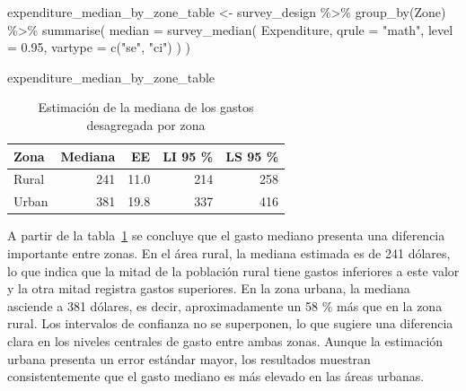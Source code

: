 \documentclass[
  spanish,
  11pt,
  letterpaper,
  oneside,
  open=any]{scrbook}
\newenvironment{Shaded}{\begin{snugshade}}{\end{snugshade}}
\newcommand{\AttributeTok}[1]{\textcolor[rgb]{0.40,0.45,0.13}{#1}}
\newcommand{\FloatTok}[1]{\textcolor[rgb]{0.68,0.00,0.00}{#1}}
\newcommand{\FunctionTok}[1]{\textcolor[rgb]{0.28,0.35,0.67}{#1}}
\newcommand{\NormalTok}[1]{\textcolor[rgb]{0.00,0.23,0.31}{#1}}
\newcommand{\OtherTok}[1]{\textcolor[rgb]{0.00,0.23,0.31}{#1}}
\newcommand{\SpecialCharTok}[1]{\textcolor[rgb]{0.37,0.37,0.37}{#1}}
\newcommand{\StringTok}[1]{\textcolor[rgb]{0.13,0.47,0.30}{#1}}
\begin{document}
\begin{Shaded}
\begin{Highlighting}[]
\NormalTok{expenditure\_median\_by\_zone\_table }\OtherTok{\textless{}{-}}\NormalTok{ survey\_design }\SpecialCharTok{\%\textgreater{}\%}
  \FunctionTok{group\_by}\NormalTok{(Zone) }\SpecialCharTok{\%\textgreater{}\%}
  \FunctionTok{summarise}\NormalTok{(}
    \AttributeTok{median =} \FunctionTok{survey\_median}\NormalTok{(}
\NormalTok{      Expenditure,}
      \AttributeTok{qrule =} \StringTok{"math"}\NormalTok{,}
      \AttributeTok{level =} \FloatTok{0.95}\NormalTok{,}
      \AttributeTok{vartype =} \FunctionTok{c}\NormalTok{(}\StringTok{"se"}\NormalTok{, }\StringTok{"ci"}\NormalTok{)}
\NormalTok{    )}
\NormalTok{  )}

\NormalTok{expenditure\_median\_by\_zone\_table}
\end{Highlighting}
\end{Shaded}

{

\begin{longtable}[]{@{}lrrrr@{}}

\caption{\label{tbl-mediana-gasto-zona}Estimación de la mediana de los
gastos desagregada por zona}

\tabularnewline

\toprule\noalign{}
Zona & Mediana & EE & LI 95 \% & LS 95 \% \\
\midrule\noalign{}
\endhead
\bottomrule\noalign{}
\endlastfoot
Rural & 241 & 11.0 & 214 & 258 \\
Urban & 381 & 19.8 & 337 & 416 \\

\end{longtable}

}

A partir de la tabla~\ref{tbl-mediana-gasto-zona} se concluye que el
gasto mediano presenta una diferencia importante entre zonas. En el área
rural, la mediana estimada es de 241 dólares, lo que indica que la mitad
de la población rural tiene gastos inferiores a este valor y la otra
mitad registra gastos superiores. En la zona urbana, la mediana asciende
a 381 dólares, es decir, aproximadamente un 58 \% más que en la zona
rural. Los intervalos de confianza no se superponen, lo que sugiere una
diferencia clara en los niveles centrales de gasto entre ambas zonas.
Aunque la estimación urbana presenta un error estándar mayor, los
resultados muestran consistentemente que el gasto mediano es más elevado
en las áreas urbanas.
\end{document}

